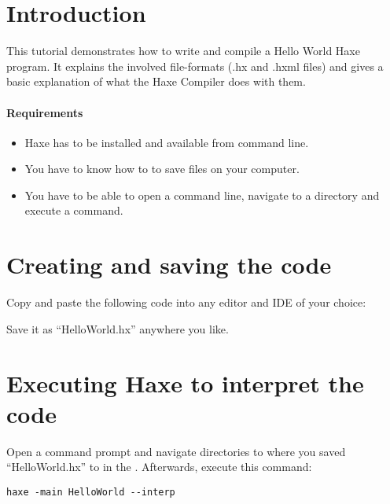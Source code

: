 \label{hello-world}

\subtoc

\section*{Introduction}
\label{hello-world-introduction}

This tutorial demonstrates how to write and compile a Hello World Haxe program. It explains the involved file-formats (.hx and .hxml files) and gives a basic explanation of what the Haxe Compiler does with them.

\paragraph{Requirements}

\begin{itemize}
	\item Haxe has to be installed and available from command line.
	\item You have to know how to to save files on your computer.
	\item You have to be able to open a command line, navigate to a directory and execute a command.
\end{itemize}

\section*{Creating and saving the code}
\label{hello-world-code}

Copy and paste the following code into any editor and IDE of your choice:


Save it as ``HelloWorld.hx'' anywhere you like.

\section*{Executing Haxe to interpret the code}
\label{hello-world-executing}

Open a command prompt and navigate directories to where you saved ``HelloWorld.hx'' to in the . Afterwards, execute this command:

\begin{lstlisting}
haxe -main HelloWorld --interp
\end{lstlisting}